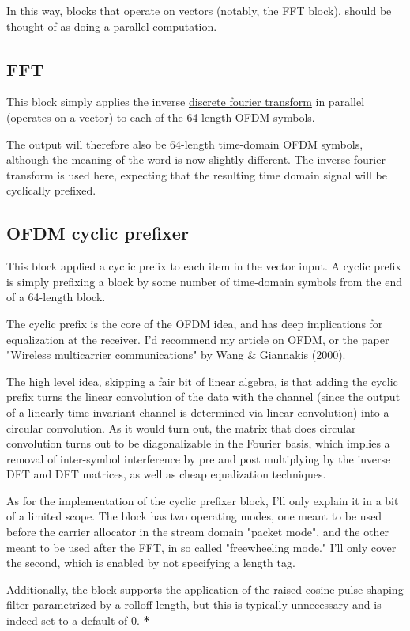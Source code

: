 \documentclass[11pt]{article}
\begin{document}
In this way, blocks that operate on vectors (notably, the FFT block),
should be thought of as doing a parallel computation.
\subsection{FFT}
\label{sec:orgf7f0344}
This block simply applies the inverse \href{https://notes.esrh.me/fourier\_transform.html}{discrete fourier transform} in
parallel (operates on a vector) to each of the 64-length OFDM symbols.

The output will therefore also be 64-length time-domain OFDM symbols,
although the meaning of the word is now slightly different. The
inverse fourier transform is used here, expecting that the resulting
time domain signal will be cyclically prefixed.
\subsection{OFDM cyclic prefixer}
\label{sec:org3873523}
This block applied a cyclic prefix to each item in the vector input. A
cyclic prefix is simply prefixing a block by some number of
time-domain symbols from the end of a 64-length block.

The cyclic prefix is the core of the OFDM idea, and has deep
implications for equalization at the receiver. I'd recommend my
article on OFDM, or the paper "Wireless multicarrier communications"
by Wang \& Giannakis (2000).

The high level idea, skipping a fair bit of linear algebra, is that
adding the cyclic prefix turns the linear convolution of the data with
the channel (since the output of a linearly time invariant channel is
determined via linear convolution) into a circular convolution. As it
would turn out, the matrix that does circular convolution turns out to
be diagonalizable in the Fourier basis, which implies a removal of
inter-symbol interference by pre and post multiplying by the inverse
DFT and DFT matrices, as well as cheap equalization techniques.

As for the implementation of the cyclic prefixer block, I'll only
explain it in a bit of a limited scope. The block has two operating
modes, one meant to be used before the carrier allocator in the stream
domain "packet mode", and the other meant to be used after the FFT, in
so called "freewheeling mode." I'll only cover the second, which is
enabled by not specifying a length tag.

Additionally, the block supports the application of the raised
cosine pulse shaping filter parametrized by a rolloff length, but this
is typically unnecessary and is indeed set to a default of 0.
\textbf{*}
\end{document}
